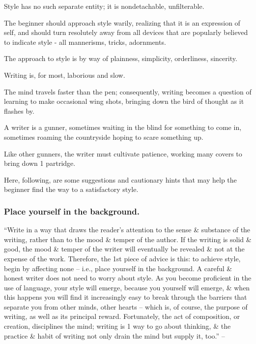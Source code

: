 \documentclass{article}
\begin{document}
Style has no such separate entity; it is nondetachable, unfilterable.

The beginner should approach style warily, realizing that it is an expression of self, and should turn resolutely away from all devices that are popularly believed to indicate style - all mannerisms, tricks, adornments.

The approach to style is by way of plainness, simplicity, orderliness, sincerity.

%
Writing is, for most, laborious and slow.

The mind travels faster than the pen; consequently, writing becomes a question of learning to make occasional wing shots, bringing down the bird of thought as it flashes by.

A writer is a gunner, sometimes waiting in the blind for something to come in, sometimes roaming the countryside hoping to scare something up.

Like other gunners, the writer must cultivate patience, working many covers to bring down 1 partridge.

Here, following, are some suggestions and cautionary hints that may help the beginner find the way to a satisfactory style.

\subsubsection{Place yourself in the background.}
``Write in a way that draws the reader's attention to the sense \& substance of the writing, rather than to the mood \& temper of the author. If the writing is solid \& good, the mood \& temper of the writer will eventually be revealed \& not at the expense of the work. Therefore, the 1st piece of advice is this: to achieve style, begin by affecting none -- i.e., place yourself in the background. A careful \& honest writer does not need to worry about style. As you become proficient in the use of language, your style will emerge, because you yourself will emerge, \& when this happens you will find it increasingly easy to break through the barriers that separate you from other minds, other hearts -- which is, of course, the purpose of writing, as well as its principal reward. Fortunately, the act of composition, or creation, disciplines the mind; writing is 1 way to go about thinking, \& the practice \& habit of writing not only drain the mind but supply it, too.'' -- \cite[p. 78]{Strunk_White_element_style}

\end{document}
